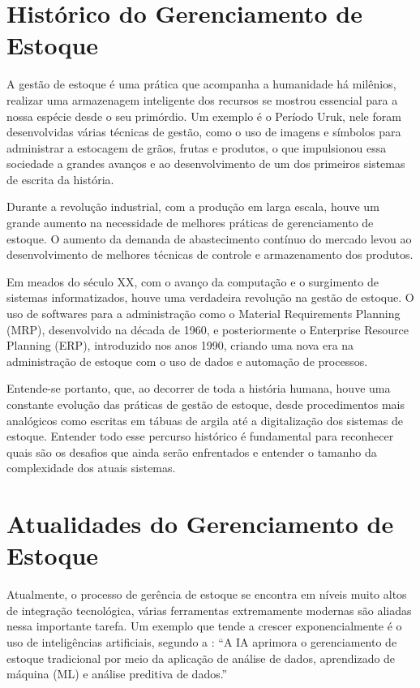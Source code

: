 \documentclass[
	12pt,				%
	openany,			%
	twoside,			%
	a4paper,			%
	english,			%
	brazil				%
	]{abntex2}
\begin{document}
\section{Histórico do Gerenciamento de Estoque}
A gestão de estoque é uma prática que acompanha a humanidade há milênios, realizar uma armazenagem inteligente dos recursos se mostrou essencial para a nossa espécie desde o seu primórdio. Um exemplo é o Período Uruk, nele foram desenvolvidas várias técnicas de gestão, como o uso de imagens e símbolos para administrar a estocagem de grãos, frutas e produtos, o que impulsionou essa sociedade a grandes avanços e ao desenvolvimento de um dos primeiros sistemas de escrita da história. \cite{Albright1996}

Durante a revolução industrial, com a produção em larga escala, houve um grande aumento na necessidade de melhores práticas de gerenciamento de estoque. O aumento da demanda de abastecimento contínuo do mercado levou ao desenvolvimento de melhores técnicas de controle e armazenamento dos produtos. \cite{DIAS2021}

Em meados do século XX, com o avanço da computação e o surgimento de sistemas informatizados, houve uma verdadeira revolução na gestão de estoque. O uso de softwares para a administração como o Material Requirements Planning (MRP), desenvolvido na década de 1960, e posteriormente o Enterprise Resource Planning (ERP), introduzido nos anos 1990, criando uma nova era na administração de estoque com o uso de dados e automação de processos.

Entende-se portanto, que, ao decorrer de toda a história humana, houve uma constante evolução das práticas de gestão de estoque, desde procedimentos mais analógicos como escritas em tábuas de argila até a digitalização dos sistemas de estoque. Entender todo esse percurso histórico é fundamental para reconhecer quais são os desafios que ainda serão enfrentados e entender o tamanho da complexidade dos atuais sistemas.

\section{Atualidades do Gerenciamento de Estoque}
Atualmente, o processo de gerência de estoque se encontra em níveis muito altos de integração tecnológica, várias ferramentas extremamente modernas são aliadas nessa importante tarefa. Um exemplo que tende a crescer exponencialmente é o uso de inteligências artificiais, segundo a : “A IA aprimora o gerenciamento de estoque tradicional por meio da aplicação de análise de dados, aprendizado de máquina (ML) e análise preditiva de dados.”
\end{document}
